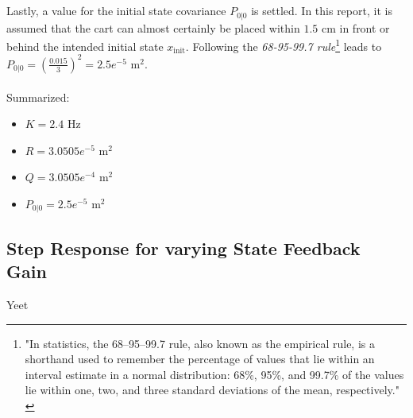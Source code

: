 \documentclass[a4paper,kul]{kulakarticle} %
\begin{document}
\\\\
Lastly, a value for the initial state covariance $P_{0|0}$ is settled. In this report, it is assumed that the cart can almost certainly be placed within $1.5$ cm in front or behind the intended initial state $x_{\text{init}}$. Following the \textit{68-95-99.7 rule}\footnote{"In statistics, the 68–95–99.7 rule, also known as the empirical rule, is a shorthand used to remember the percentage of values that lie within an interval estimate in a normal distribution: 68\%, 95\%, and 99.7\% of the values lie within one, two, and three standard deviations of the mean, respectively." \cite{68rule}} leads to $P_{0|0} = \left(\frac{0.015}{3}\right)^2 = 2.5e^{-5}$ m$^2$.
\\\\
Summarized:
\begin{multicols}{2}
	\begin{itemize}
		\item $K = 2.4$ Hz
		\item $R = 3.0505 e^{-5}$ m$^2$
		\item $Q = 3.0505 e^{-4}$ m$^2$
		\item $P_{0|0} = 2.5e^{-5}$ m$^2$
	\end{itemize}
\end{multicols}

\subsection{Step Response for varying State Feedback Gain}
Yeet




\newpage


\end{document}

